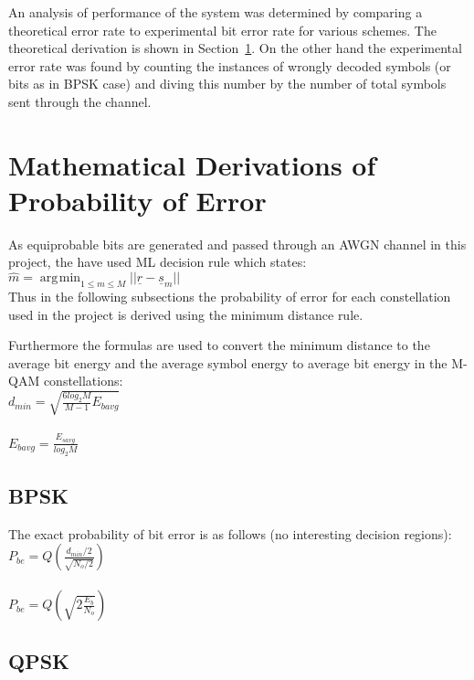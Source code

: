 \documentclass[]{article}
\DeclareMathOperator*{\argmin}{\arg\!\min}
\begin{document}
An analysis of performance of the system was determined by comparing a theoretical error rate to experimental bit error rate for various schemes.  The theoretical derivation is shown in Section~\ref{sec:deriv}. On the other hand the experimental error rate was found by counting the instances of wrongly decoded symbols (or bits as in BPSK case) and diving this number by the number of total symbols sent through the channel.  

\section{Mathematical Derivations of Probability of Error}
\label{sec:deriv}
As equiprobable bits are generated and passed through an AWGN channel in this project, the have used ML decision rule which states: \\

$\hat{m} = \argmin_{1\leq m \leq M}{||\underline{r} - \underline{s}_m||}$ 
\\

Thus in the following subsections the probability of error for each constellation used in the project is derived using the minimum distance rule.

Furthermore the formulas are used to convert the minimum distance to the average bit energy and the average symbol energy to average bit energy in the M-QAM constellations:\\

$d_{min} = \sqrt{\frac{6log_2M}{M-1}E_{bavg}} $\\ \\

$E_{bavg} = \frac{E_{savg}}{log_2M}$



\subsection{BPSK}
\label{sec:bpsk}
The exact probability of bit error is as follows (no interesting decision regions):\\

$ P_{be} = Q\left(\frac{d_{min}/2}{\sqrt{N_o/2}}\right) $ \\ \\

$ P_{be} = Q\left(\sqrt{2\frac{E_b}{N_o}}\right) $ \\

\subsection{QPSK}
\label{sec:qpsk}
\end{document}
